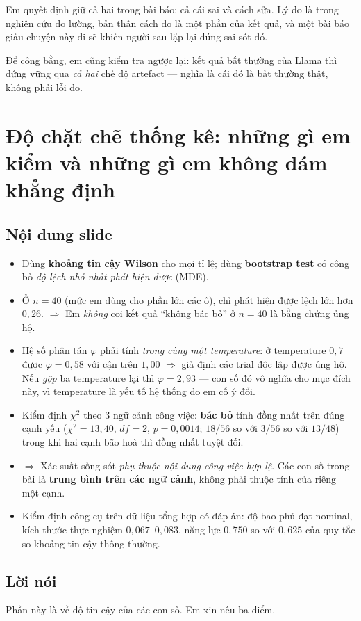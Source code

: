 \documentclass[11pt,a4paper]{article}
\newcommand{\slide}[1]{\section{#1}}
\newcommand{\noidung}{\subsection*{Nội dung slide}}
\newcommand{\loinoi}{\subsection*{Lời nói}}
\begin{document}
Em quyết định giữ cả hai trong bài báo: cả cái sai và cách sửa. Lý do là trong nghiên
cứu đo lường, bản thân cách đo là một phần của kết quả, và một bài báo giấu chuyện này
đi sẽ khiến người sau lặp lại đúng sai sót đó.

Để công bằng, em cũng kiểm tra ngược lại: kết quả bất thường của Llama thì đứng vững
qua \emph{cả hai} chế độ artefact --- nghĩa là cái đó là bất thường thật, không phải
lỗi đo.

\slide{Độ chặt chẽ thống kê: những gì em kiểm và những gì em không dám khẳng định}

\noidung
\begin{itemize}
  \item Dùng \textbf{khoảng tin cậy Wilson} cho mọi tỉ lệ; dùng \textbf{bootstrap test}
        có công bố \emph{độ lệch nhỏ nhất phát hiện được} (MDE).
  \item Ở $n = 40$ (mức em dùng cho phần lớn các ô), chỉ phát hiện được lệch lớn hơn
        $0{,}26$. $\Rightarrow$ Em \emph{không} coi kết quả ``không bác bỏ'' ở $n = 40$
        là bằng chứng ủng hộ.
  \item Hệ số phân tán $\varphi$ phải tính \emph{trong cùng một temperature}: ở
        temperature $0{,}7$ được $\varphi = 0{,}58$ với cận trên $1{,}00$
        $\Rightarrow$ giả định các trial độc lập được ủng hộ.
        Nếu \emph{gộp} ba temperature lại thì $\varphi = 2{,}93$ --- con số đó vô nghĩa
        cho mục đích này, vì temperature là yếu tố hệ thống do em cố ý đổi.
  \item Kiểm định $\chi^2$ theo 3 ngữ cảnh công việc: \textbf{bác bỏ} tính đồng nhất
        trên đúng cạnh yếu ($\chi^2 = 13{,}40$, $df = 2$, $p = 0{,}0014$;
        $18/56$ so với $3/56$ so với $13/48$) trong khi hai cạnh bão hoà thì đồng nhất
        tuyệt đối.
  \item $\Rightarrow$ Xác suất sống sót \emph{phụ thuộc nội dung công việc hợp lệ}.
        Các con số trong bài là \textbf{trung bình trên các ngữ cảnh}, không phải thuộc
        tính của riêng một cạnh.
  \item Kiểm định công cụ trên dữ liệu tổng hợp có đáp án: độ bao phủ đạt nominal, kích
        thước thực nghiệm $0{,}067$--$0{,}083$, năng lực $0{,}750$ so với $0{,}625$ của
        quy tắc so khoảng tin cậy thông thường.
\end{itemize}

\loinoi
Phần này là về độ tin cậy của các con số. Em xin nêu ba điểm.
\end{document}
